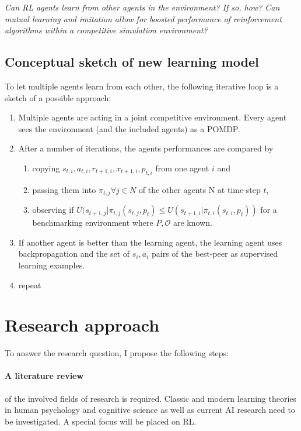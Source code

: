 \documentclass[12pt,a4paper]{article}
\begin{document}
\emph{Can \ac{RL} agents learn from other agents in the environment? If so, how? Can mutual learning and imitation allow for boosted performance of reinforcement algorithms within a competitive simulation environment?}

\subsection{Conceptual sketch of new learning model}

To let multiple agents learn from each other, the following iterative loop is a sketch of a possible approach:



\begin{enumerate}
    \item Multiple agents are acting in a joint competitive environment. Every agent sees the environment (and the included agents) as a \ac{POMDP}.
    \item After a number of iterations, the agents performances are compared by

\begin{enumerate}
    \item copying
    $s_{t,i},a_{t,i},r_{t+1,i},x_{t+1,i},p_{t,i}$ from one agent $i$ and
    \item passing them into $\pi_{t,j} \forall j \in N $ of the other agents N at time-step $t$,
    \item  observing if $ U(s_{t+1,j} \vert \pi_{t,j}(s_{t,j}, p_t) \leq U(s_{t+1,i} \vert \pi_{t,i}(s_{t,i},p_t))$ for a benchmarking environment where $P, \mathcal{O}$ are known.
\end{enumerate}
    \item  If another agent is better than the learning agent, the learning agent uses backpropagation and the set of $s_i,a_i$ pairs of the best-peer as supervised learning examples.
    \item repeat
\end{enumerate}

\section{Research approach}


To answer the research question, I propose the following steps:

\paragraph{A literature review} of the involved fields of research is required. Classic and modern learning theories in human psychology and cognitive science as well as current AI research need to be investigated. A special focus will be placed on \ac{RL}.
\end{document}

